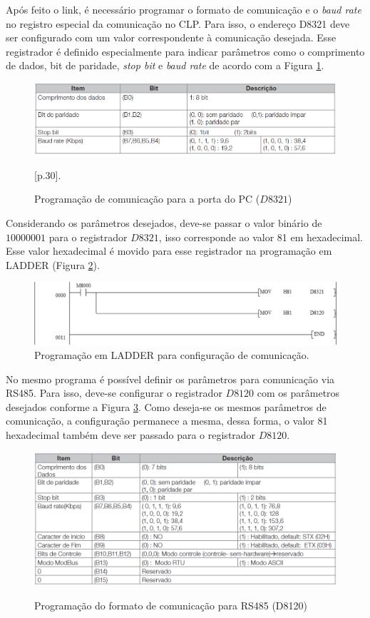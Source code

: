 Após feito o link, é necessário programar o formato de comunicação e o \textit{baud rate} no registro especial da comunicação no CLP. Para isso, o endereço D8321 deve ser configurado com um valor correspondente à comunicação desejada. Esse registrador é definido especialmente para indicar parâmetros como o comprimento de dados, bit de paridade, \textit{stop bit} e \textit{baud rate} de acordo com a Figura \ref{fig:portaPC}.

\begin{figure}[h!]
\centering
\includegraphics[scale=0.7]{portaPC.png}
\caption{Programação de comunicação para a porta do PC ($D8321$)}\cite{weg2010manualinstalacao}[p.30].
\label{fig:portaPC}
\end{figure}

Considerando os parâmetros desejados, deve-se passar o valor binário de $10000001$ para o registrador $D8321$, isso corresponde ao valor 81 em hexadecimal. Esse valor hexadecimal é movido para esse registrador na programação em LADDER (Figura \ref{fig:LadderComunicacao}). 

\begin{figure}[h!]
\centering
\includegraphics[scale=0.65]{ladderComunicacao.png}
\caption{Programação em LADDER para configuração de comunicação.}
\label{fig:LadderComunicacao}
\end{figure}

No mesmo programa é possível definir os parâmetros para comunicação via RS485. Para isso, deve-se configurar o registrador $D8120$ com os parâmetros desejados conforme a Figura \ref{fig:rs485}. Como deseja-se os mesmos parâmetros de comunicação, a configuração permanece a mesma, dessa forma, o valor 81 hexadecimal também deve ser passado para o registrador $D8120$.

\begin{figure}[h!]
\centering
\includegraphics[scale=0.7]{rs485.png}
\caption{Programação do formato de comunicação para RS485 (D8120)}\cite{weg2010manualinstalacao}
\label{fig:rs485}
\end{figure}

